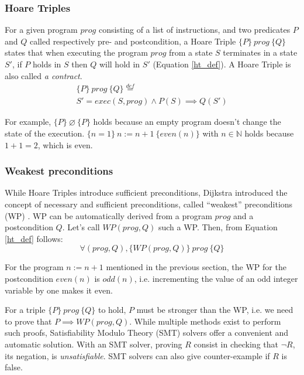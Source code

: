 \documentclass[10pt,a4paper]{article}
\newcommand{\htriple}[3]{\ensuremath{\{#1\}~#2~\{#3\}}}
\newcommand{\WP}{\ensuremath{\mathit{WP}}}
\newcommand{\eqdef}{\stackrel{def}{=}}
\begin{document}
\begin{multicols}{2}

\subsubsection{Hoare Triples} \label{hoare-triples}

For a given program $prog$ consisting of a list of instructions, and two predicates $P$ and $Q$ called respectively pre- and postcondition, a Hoare Triple \htriple{P}{prog}{Q} states that when executing the program $prog$ from a state $S$ terminates in a state $S'$, if $P$ holds in $S$ then $Q$ will hold in $S'$ (Equation \ref{ht_def}). A Hoare Triple is also called \textit{a contract}.
%
\begin{multline}
  \htriple{P}{prog}{Q} \eqdef\\
  S' = exec(S, prog) \land P(S) \implies Q(S')
  \label{ht_def}
\end{multline}

For example, \htriple{P}{\varnothing}{P} holds because an empty program doesn't change the state of the execution. \htriple{n=1}{n:=n+1}{even(n)} with $n \in \mathbb{N}$ holds because $1+1=2$, which is even.

\subsubsection{Weakest preconditions}

While Hoare Triples introduce sufficient preconditions, Dijkstra introduced the concept of necessary and sufficient preconditions, called ``weakest'' preconditions (WP) \cite{dijkstra_guarded_1975}. WP can be automatically derived from a program $prog$ and a postcondition $Q$. Let's call $\WP(prog, Q)$ such a WP. Then, from Equation \ref{ht_def} follows:
%
\begin{equation}
  \forall (prog, Q),
  \htriple{\WP(prog,Q)}{prog}{Q}
  \label{ht_wp_eq}
\end{equation}

For the program $n:=n+1$ mentioned in the previous section, the WP for the postcondition $even(n)$ is $odd(n)$, i.e. incrementing the value of an odd integer variable by one makes it even.

For a triple \htriple{P}{prog}{Q} to hold, $P$ must be stronger than the WP, i.e. we need to prove that $P \implies \WP(prog, Q)$. While multiple methods exist to perform such proofs, Satisfiability Modulo Theory ({SMT}) solvers offer a convenient and automatic solution. With an SMT solver, proving $R$ consist in checking that $\neg R$, its negation, is \textit{unsatisfiable}. SMT solvers can also give counter-example if $R$ is false.


\end{multicols}
\end{document}
